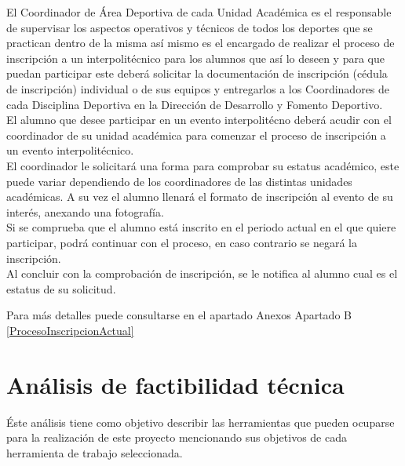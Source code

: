 	\noident El Coordinador de Área Deportiva de cada Unidad Académica es el responsable de supervisar los aspectos operativos y técnicos de todos los deportes que se practican dentro de la misma así mismo es el encargado de realizar el proceso de inscripción a un interpolitécnico para los alumnos que así lo deseen y para que puedan participar este deberá solicitar la documentación de inscripción (cédula de inscripción) individual o de sus equipos y entregarlos a los Coordinadores de cada Disciplina Deportiva en la Dirección de Desarrollo y Fomento Deportivo. \cite{Reglamento} \\
	\noident  El alumno que desee participar en un evento interpolitécno deberá acudir con el coordinador de su unidad académica para comenzar el proceso de inscripción a un evento interpolitécnico. 
	\\El coordinador le solicitará una forma para comprobar su estatus académico, este puede variar dependiendo de los coordinadores de las distintas unidades académicas. A su vez el alumno llenará el formato de inscripción al evento de su interés, anexando una fotografía. 
	\\ Si se comprueba que el alumno está inscrito en el periodo actual en el que quiere participar, podrá continuar con el proceso, en caso contrario se negará la inscripción. \cite{Reglamento}
	\\ Al concluir con la comprobación de inscripción, se le notifica al alumno cual es el estatus de su solicitud. 
	
	\noindent Para más detalles puede consultarse en el apartado Anexos Apartado B \ref{ProcesoInscripcionActual}
	
	
	
	\section{An\'alisis de factibilidad t\'ecnica}
	Éste análisis tiene como objetivo describir las herramientas que pueden ocuparse para la realización de este proyecto mencionando sus objetivos de cada herramienta de trabajo seleccionada.
	
